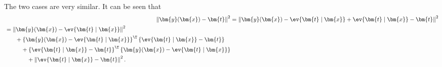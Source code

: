 \begin{answer}{}
	The two cases are very similar. It can be seen that
	\begin{align}
		\left\lVert \bm{y}(\bm{x}) - \bm{t} \right\rVert^2 &= \left\lVert \bm{y}(\bm{x}) -\ev{\bm{t} \mid \bm{x}} + \ev{\bm{t} \mid \bm{x}} - \bm{t} \right\rVert^2\\
		\begin{split}
			&= \left\lVert \bm{y}(\bm{x}) -\ev{\bm{t} \mid \bm{x}} \right\rVert^2\\
			&\phantom{=}\quad + \left\{ \bm{y}(\bm{x}) -\ev{\bm{t} \mid \bm{x}} \right\}^{\T}\left\{ \ev{\bm{t} \mid \bm{x}} - \bm{t} \right\}\\
			&\phantom{=}\quad\quad + \left\{ \ev{\bm{t} \mid \bm{x}} - \bm{t} \right\}^{\T}\left\{ \bm{y}(\bm{x}) -\ev{\bm{t} \mid \bm{x}} \right\}\\
			&\phantom{=}\quad\quad\quad + \left\lVert \ev{\bm{t} \mid \bm{x}} - \bm{t} \right\rVert^2.
		\end{split}
	\end{align}
	

\end{answer}
